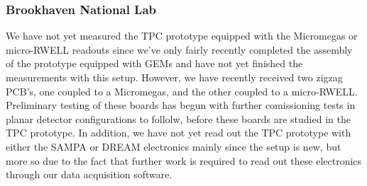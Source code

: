 \subsubsection{Brookhaven National Lab} 
We have not yet measured the TPC prototype equipped with the Micromegas or micro-RWELL readouts since we've only fairly recently completed the assembly of the prototype equipped with GEMs and have not yet finished the measurements with this setup. However, we have recently received two zigzag PCB's, one coupled to a Micromegas, and the other coupled to a micro-RWELL. Preliminary testing of these boards has begun with further comissioning tests in planar detector configurations to follolw, before these boards are studied in the TPC prototype. In addition, we have not yet read out the TPC prototype with either the SAMPA or DREAM electronics mainly since the setup is new, but more so due to the fact that further work is required to read out these electronics through our data acquisition software.      